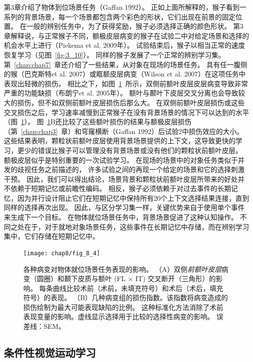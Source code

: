第3章介绍了物体到位场景任务（Gaffan 1992）。
正如上面所解释的，猴子看到一系列的背景场景，每一个场景都包含两个彩色的形状，它们出现在前景的固定位置。
在一般的辨别任务中，为了获得奖励，猴子必须选择正确的颜色形状。
第3章解释说，与正常猴子不同，额极皮层病变的猴子在试验二中对给定场景和选择的机会水平上进行（Piekema et al. 2009年）。
试验结束后，猴子以相当正常的速度恢复学习（见图~\ref{fig:3_10}）。
同样的猴子发展了一个正常的辨别学习集。
第~\ref{chap:chap7}~章还介绍了一些结果，从对象在现场的场景任务。
具有任一腹侧的猴（巴克斯特et al. 2007）或眶额皮层病变（Wilson et al. 2007）在这项任务中表现出轻微的损伤。
相比之下，如图~\ref{fig:8_4}~所示，双侧前额叶皮层皮层病变导致非常严重的功能缺损（布朗宁et al. 2005年）。
额叶与颞叶下皮层交叉分离也会导致较大的损伤，但不如双侧前额叶皮层损伤后那么大。
在双侧前额叶皮层损伤或这些交叉损伤之后，学习速率减慢到正常猴子在没有背景场景的情况下可以达到的水平（图~\ref{fig:8_4}）。
图~\ref{fig:8_4}B还比较了这些额叶损伤的结果与额极皮层损伤（第~\ref{chap:chap3}~章）和穹窿横断（Gaffan 1992）后试验2中损伤效应的大小。
这些结果表明，颗粒状前额叶皮层使用背景场景提供的上下文，这导致更快的学习，更少的错误比猴子可以管理没有背景场景或没有他们的颗粒状前额叶皮层。
额极皮层似乎是特别重要的一次试验学习。
在现场的场景中的对象任务类似于并发的歧视任务之前描述的，
许多试验之间的再现一个给定的场景和它的选择刺激干预。
因此，我们可以得出结论，场景背景和颗粒状前额叶皮层所带来的好处并不依赖于短期记忆或前瞻性编码。
相反，猴子必须依赖于对过去事件的长期记忆，因为并行设计阻止它们在短期记忆中保持所有20个上下文选择结果连接，直到同样的选择再次出现。
因此，与区分学习集一样，关键优势来自于使用单个事件来生成下一个目标。
在物体就位场景任务中，背景场景促进了这种认知操作。
不同之处在于，对于就地对象场景任务，这些事件在长期记忆中存储，而在辨别学习集中，它们存储在短期记忆中。


\begin{figure} 
	\centering
	\texttt{[image: chap8/fig\_8\_4]}
	\caption{各种病变对物体就位场景任务表现的影响。
		（A）双侧\textit{前额叶皮层}病变（圆圈）和颞下皮质与额叶 (FL × IT) 交叉断开（三角形）的影响。
		每条曲线比较术前（术前，未填充符号）和术后（术后，填充符号）的表现\cite{browning2005role}。
		（B）几种病变组的损伤指数。该指数将病变造成的损伤绘制为最大可能表现缺陷的比例。
		这种标准化方法消除了术前表现变量的影响。虚线显示选择用于比较的选择性病变的影响。
		误差线：SEM\cite{wilson2010functional}。\label{fig:8_4}}
\end{figure}



\subsection{条件性视觉运动学习}

